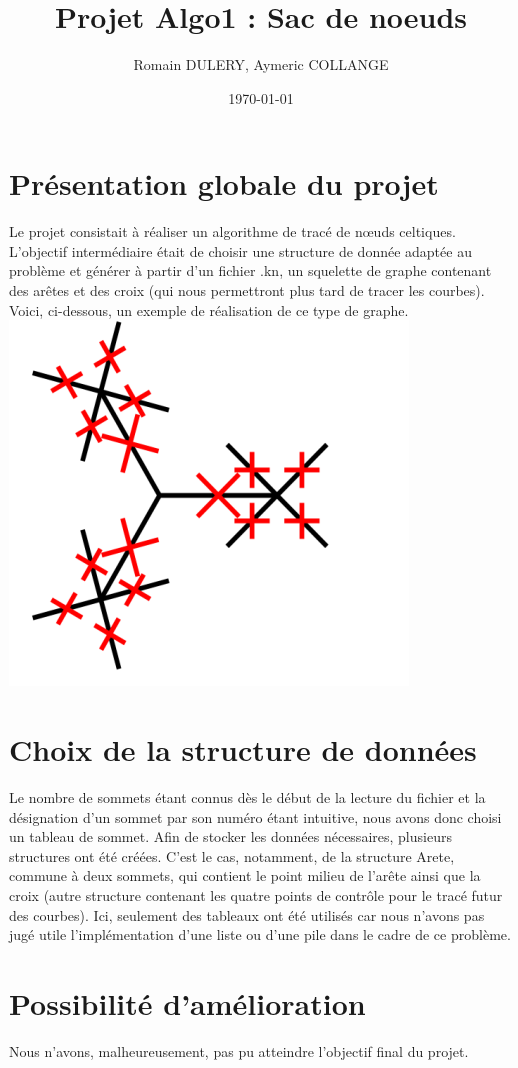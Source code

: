 \documentclass[a4paper,11pt]{article}
\title{Projet Algo1 : Sac de noeuds}
\author{Romain DULERY, Aymeric COLLANGE}
\date{\today}
\begin{document}
\maketitle

\section{Présentation globale du projet}

Le projet consistait à réaliser un algorithme de tracé de nœuds celtiques.
L'objectif intermédiaire était de choisir une structure de donnée adaptée au problème et générer à partir d'un fichier .kn, un squelette de graphe contenant des arêtes et des croix (qui nous permettront  plus tard de tracer les courbes).
Voici, ci-dessous, un exemple de réalisation de ce type de graphe.\\

\includegraphics{Banana4.png}

\section{Choix de la structure de données}

Le nombre de sommets étant connus dès le début de la lecture du fichier et la désignation d'un sommet par son numéro étant intuitive, nous avons donc choisi un tableau de sommet.
Afin de stocker les données nécessaires, plusieurs structures ont été créées. C'est le cas, notamment, de la structure Arete, commune à deux sommets, qui contient le point milieu de l'arête ainsi que la croix (autre structure contenant les quatre points de contrôle pour le tracé futur des courbes).
Ici, seulement des tableaux ont été utilisés car nous n'avons pas jugé utile l'implémentation d'une liste ou d'une pile dans le cadre de ce problème.

\section{Possibilité d'amélioration}

Nous n'avons, malheureusement, pas pu atteindre l'objectif final du projet.
\end{document}
